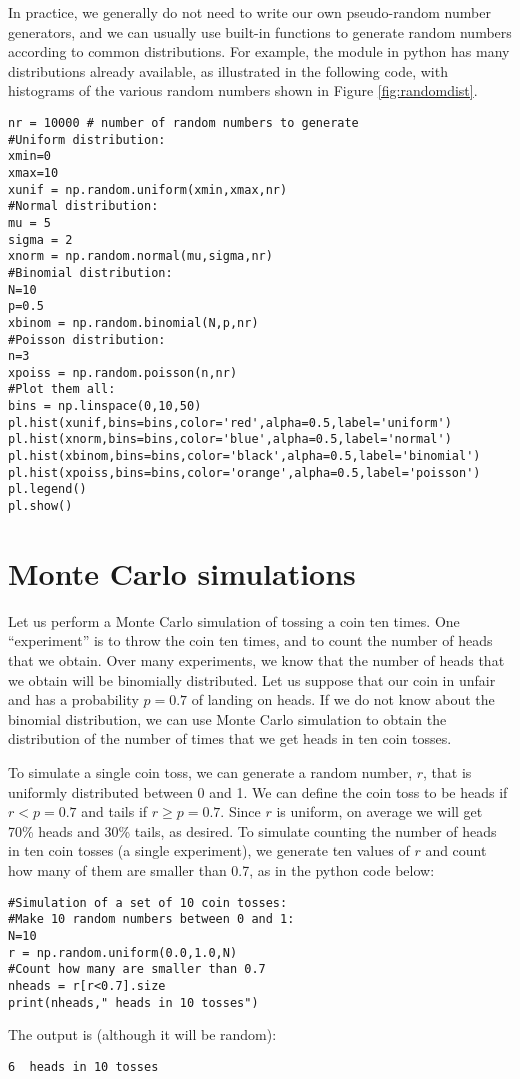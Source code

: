 In practice, we generally do not need to write our own pseudo-random number generators, and we can usually use built-in functions to generate random numbers according to common distributions. For example, the  module in python has many distributions already available, as illustrated in the following code, with histograms of the various random numbers shown in Figure \ref{fig:randomdist}.
\begin{lstlisting}[frame=single] 
nr = 10000 # number of random numbers to generate
#Uniform distribution:
xmin=0
xmax=10
xunif = np.random.uniform(xmin,xmax,nr)
#Normal distribution:
mu = 5
sigma = 2
xnorm = np.random.normal(mu,sigma,nr)
#Binomial distribution:
N=10
p=0.5
xbinom = np.random.binomial(N,p,nr)
#Poisson distribution:
n=3
xpoiss = np.random.poisson(n,nr)
#Plot them all:
bins = np.linspace(0,10,50)
pl.hist(xunif,bins=bins,color='red',alpha=0.5,label='uniform')
pl.hist(xnorm,bins=bins,color='blue',alpha=0.5,label='normal')
pl.hist(xbinom,bins=bins,color='black',alpha=0.5,label='binomial')
pl.hist(xpoiss,bins=bins,color='orange',alpha=0.5,label='poisson')
pl.legend()
pl.show()
\end{lstlisting}

\section{Monte Carlo simulations}
Let us perform a Monte Carlo simulation of tossing a coin ten times. One ``experiment'' is to throw the coin ten times, and to count the number of heads that we obtain. Over many experiments, we know that the number of heads that we obtain will be binomially distributed. Let us suppose that our coin in unfair and has a probability $p=0.7$ of landing on heads. If we do not know about the binomial distribution, we can use Monte Carlo simulation to obtain the distribution of the number of times that we get heads in ten coin tosses.

To simulate a single coin toss, we can generate a random number, $r$, that is uniformly distributed between 0 and 1. We can define the coin toss to be heads if $r<p=0.7$ and tails if $r\geq p= 0.7$. Since $r$ is uniform, on average we will get 70\% heads and 30\% tails, as desired. To simulate counting the number of heads in ten coin tosses (a single experiment), we generate ten values of $r$ and count how many of them are smaller than 0.7, as in the python code below:
\begin{lstlisting}[frame=single] 
#Simulation of a set of 10 coin tosses:
#Make 10 random numbers between 0 and 1:
N=10
r = np.random.uniform(0.0,1.0,N)
#Count how many are smaller than 0.7
nheads = r[r<0.7].size
print(nheads," heads in 10 tosses")
\end{lstlisting}
The output is (although it will be random):
\begin{verbatim}
6  heads in 10 tosses
\end{verbatim}

